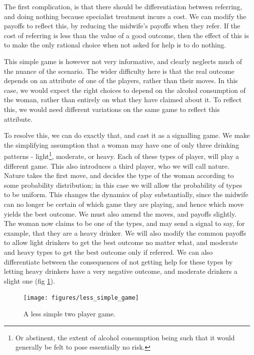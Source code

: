 The first complication, is that there should be differentiation between referring, and doing nothing because specialist treatment incurs a cost. We can modify the payoffs to reflect this, by reducing the midwife's payoffs when they refer. If the cost of referring is less than the value of a good outcome, then the effect of this is to make the only rational choice when not asked for help is to do nothing.

This simple game is however not very informative, and clearly neglects much of the nuance of the scenario. The wider difficulty here is that the real outcome depends on an attribute of one of the players, rather than their moves. In this case, we would expect the right choices to depend on the alcohol consumption of the woman, rather than entirely on what they have claimed about it.
To reflect this, we would need different variations on the same game to reflect this attribute. 

To resolve this, we can do exactly that, and cast it as a signalling game. We make the simplifying assumption that a woman may have one of only three drinking patterns - light\footnote{Or abstinent, the extent of alcohol consumption being such that it would generally be felt to pose essentially no risk.}, moderate, or heavy. Each of these types of player, will play a different game. This also introduces a third player, who we will call nature. Nature takes the first move, and decides the type of the woman according to some probability distribution; in this case we will allow the probability of types to be uniform. 
This changes the dynamics of play substantially, since the midwife can no longer be certain of which game they are playing, and hence which move yields the best outcome. We must also amend the moves, and payoffs slightly. The woman now claims to be one of the types, and may send a signal to say, for example, that they are a heavy drinker. We will also modify the common payoffs to allow light drinkers to get the best outcome no matter what, and moderate and heavy types to get the best outcome only if referred. We can also differentiate between the consequences of not getting help for these types by letting heavy drinkers have a very negative outcome, and moderate drinkers a slight one (fig \ref{fig:less_simple}).

\begin{figure}[H]
\begin{adjustbox}{center}
\texttt{[image: figures/less\_simple\_game]}
\end{adjustbox}
\caption{A less simple two player game.}

\label{fig:less_simple}
\end{figure}


